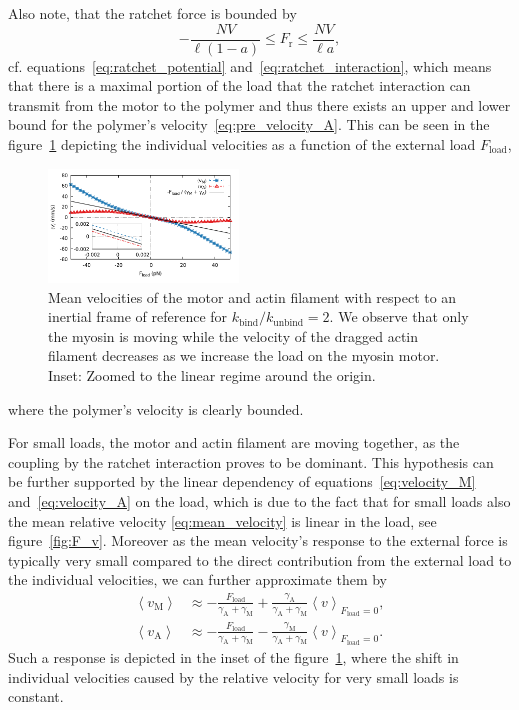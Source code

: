 \documentclass[aps,pre,twocolumn,showpacs,showkeys,superscriptaddress,floatfix]{revtex4-1}
\begin{document}
Also note, that the ratchet force is bounded by 
\begin{equation}
- \frac{ N V }{ \ell (1-a) } 
\le 
F_\text{r}
\le
\frac{ N V }{ \ell a } ,
\label{eq:ratchet_force_bounds}
\end{equation}
cf. equations~\eqref{eq:ratchet_potential} and~\eqref{eq:ratchet_interaction}, 
which means that there is a maximal portion of the load that the ratchet interaction can transmit from the motor to the polymer 
and thus there exists an upper and lower bound for the polymer's velocity~\eqref{eq:pre_velocity_A}.   
This can be seen in the figure~\ref{fig:ind_v} depicting the individual velocities as a function of the external load $F_\text{load}$,  
\begin{figure}[t]
\centering
\includegraphics[width=0.45\textwidth,height=!]{individual_velocities}
\caption{
\label{fig:ind_v} 
Mean velocities of the motor and actin filament with respect to an inertial frame of reference for $k_\text{bind}/k_\text{unbind} = 2$.
We observe that only the myosin is moving while the velocity of the dragged actin filament decreases as we increase the load on the myosin motor.
Inset: Zoomed to the linear regime around the origin.
}
\end{figure}
where the polymer's velocity is clearly bounded. 

For small loads, the motor and actin filament are moving together, as the coupling by the ratchet interaction proves to be dominant. 
This hypothesis can be further supported by the linear dependency of equations~\eqref{eq:velocity_M} and~\eqref{eq:velocity_A} on the load, 
which is due to the fact that for small loads also the mean relative velocity \eqref{eq:mean_velocity} is linear in the load, see figure~\ref{fig:F_v}. 
Moreover as the mean velocity's response to the external force is typically very small compared to the direct contribution from the external load to the individual velocities,
we can further approximate them by  
\begin{align*}
\left\langle v_\text{M} \right\rangle 
&\approx - \frac{ F_\text{load} }{ \gamma_\text{A} + \gamma_\text{M} } + \frac{ \gamma_\text{A} }{ \gamma_\text{A} + \gamma_\text{M} } \left\langle v \right\rangle_{ F_\text{load} = 0 },
\\
\left\langle v_\text{A} \right\rangle 
&\approx - \frac{ F_\text{load} }{ \gamma_\text{A} + \gamma_\text{M} } - \frac{ \gamma_\text{M} }{ \gamma_\text{A} + \gamma_\text{M} } \left\langle v \right\rangle_{ F_\text{load} = 0 } .
\end{align*}
Such a response is depicted in the inset of the figure~\ref{fig:ind_v}, where the shift in individual velocities caused by the relative velocity for very small loads is constant.
\end{document}
